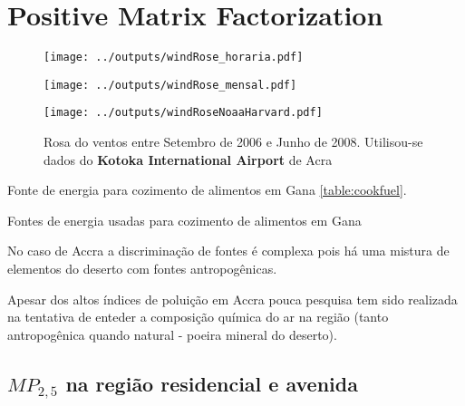 \section{Positive Matrix Factorization}

\begin{figure}[H]
  \centering
  \texttt{[image: ../outputs/windRose\_horaria.pdf]}
  \caption{ \citep{carslaw2012} \label{fig:windRose_horaria}}
\end{figure}

\begin{figure}[H]
  \centering
  \texttt{[image: ../outputs/windRose\_mensal.pdf]}
  \caption{ \citep{carslaw2012} \label{fig:windRose_mensal}}
\end{figure}


\begin{figure}[H]
  \centering
  \texttt{[image: ../outputs/windRoseNoaaHarvard.pdf]}
  \caption{Rosa do ventos entre
           Setembro de 2006 e Junho de 2008. Utilisou-se dados 
           do \textbf{Kotoka International Airport} de Acra \label{fg:rosaCompleta}}
\end{figure}

Fonte de energia para cozimento de alimentos em Gana \ref{table:cookfuel}.
\begin{table}[H]
 \centering
  
  \caption{Fontes de energia usadas para cozimento de alimentos em 
           Gana \citep{ghanacensus2013} \label{table:cookfuel}}
\end{table}

No caso de Accra a discriminação de fontes é complexa pois
há uma mistura de elementos do deserto com fontes antropogênicas.

Apesar dos altos índices de poluição em Accra pouca pesquisa tem sido 
realizada na tentativa de enteder a composição química do ar na região
(tanto antropogênica quando natural - poeira mineral do deserto). 

\subsection{$MP_{2,5}$ na região residencial e avenida}

